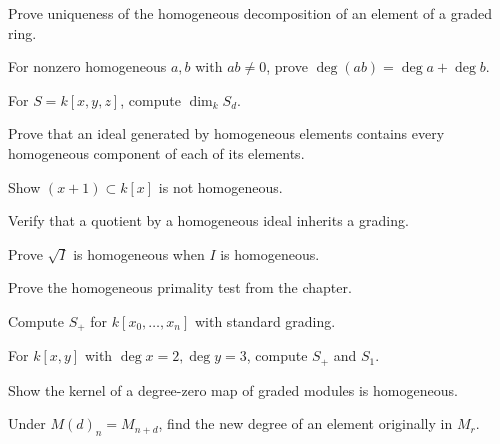 \begin{exercise}\label{exr:vi34-01}
Prove uniqueness of the homogeneous decomposition of an element of a graded ring.
\end{exercise}
\begin{exercise}\label{exr:vi34-02}
For nonzero homogeneous \(a,b\) with \(ab\neq0\), prove \(\deg(ab)=\deg a+\deg b\).
\end{exercise}
\begin{exercise}\label{exr:vi34-03}
For \(S=k[x,y,z]\), compute \(\dim_kS_d\).
\end{exercise}
\begin{exercise}\label{exr:vi34-04}
Prove that an ideal generated by homogeneous elements contains every homogeneous component of each of its elements.
\end{exercise}
\begin{exercise}\label{exr:vi34-05}
Show \((x+1)\subset k[x]\) is not homogeneous.
\end{exercise}
\begin{exercise}\label{exr:vi34-06}
Verify that a quotient by a homogeneous ideal inherits a grading.
\end{exercise}
\begin{exercise}\label{exr:vi34-07}
Prove \(\sqrt I\) is homogeneous when \(I\) is homogeneous.
\end{exercise}
\begin{exercise}\label{exr:vi34-08}
Prove the homogeneous primality test from the chapter.
\end{exercise}
\begin{exercise}\label{exr:vi34-09}
Compute \(S_+\) for \(k[x_0,\ldots,x_n]\) with standard grading.
\end{exercise}
\begin{exercise}\label{exr:vi34-10}
For \(k[x,y]\) with \(\deg x=2,\deg y=3\), compute \(S_+\) and \(S_1\).
\end{exercise}
\begin{exercise}\label{exr:vi34-11}
Show the kernel of a degree-zero map of graded modules is homogeneous.
\end{exercise}
\begin{exercise}\label{exr:vi34-12}
Under \(M(d)_n=M_{n+d}\), find the new degree of an element originally in \(M_r\).
\end{exercise}
